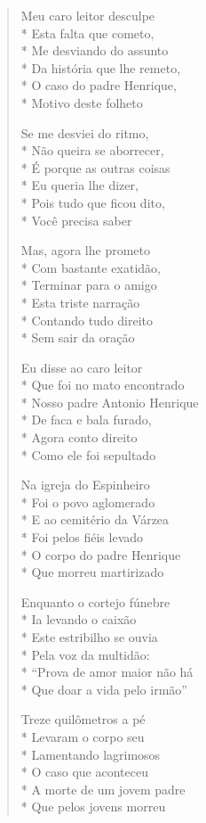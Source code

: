 \begin{verse}
Meu caro leitor desculpe\\*
Esta falta que cometo,\\*
Me desviando do assunto\\*
Da história que lhe remeto,\\*
O caso do padre Henrique,\\*
Motivo deste folheto

Se me desviei do ritmo,\\*
Não queira se aborrecer,\\*
É porque as outras coisas\\*
Eu queria lhe dizer,\\*
Pois tudo que ficou dito,\\*
Você precisa saber

Mas, agora lhe prometo\\*
Com bastante exatidão,\\*
Terminar para o amigo\\*
Esta triste narração\\*
Contando tudo direito\\*
Sem sair da oração

Eu disse ao caro leitor\\*
Que foi no mato encontrado\\*
Nosso padre Antonio Henrique\\*
De faca e bala furado,\\*
Agora conto direito\\*
Como ele foi sepultado

Na igreja do Espinheiro\\*
Foi o povo aglomerado\\*
E ao cemitério da Várzea\\*
Foi pelos fiéis levado\\*
O corpo do padre Henrique\\*
Que morreu martirizado

Enquanto o cortejo fúnebre\\*
Ia levando o caixão\\*
Este estribilho se ouvia\\*
Pela voz da multidão:\\*
“Prova de amor maior não há\\*
Que doar a vida pelo irmão”

Treze quilômetros a pé\\*
Levaram o corpo seu\\*
Lamentando lagrimosos\\*
O caso que aconteceu\\*
A morte de um jovem padre\\*
Que pelos jovens morreu


\end{verse}

